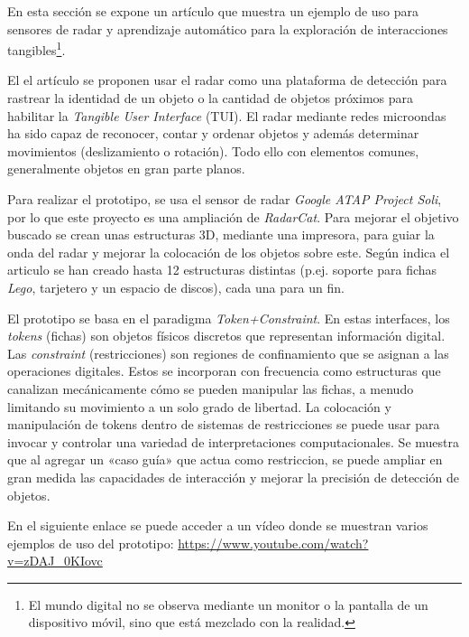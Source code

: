 En esta sección se expone un artículo que muestra un ejemplo de uso para sensores de radar y aprendizaje automático para la exploración de interacciones tangibles\footnote{El mundo digital no se observa mediante un monitor o la pantalla de un dispositivo móvil, sino que está mezclado con la realidad.}.\cite{Yeo2018Dec}  

El el artículo se proponen usar el radar como una plataforma de detección para rastrear la identidad de un objeto o la cantidad de objetos próximos para habilitar la \textit{Tangible User Interface} (TUI). El radar mediante redes microondas ha sido capaz de reconocer, contar y ordenar objetos y además determinar movimientos (deslizamiento o rotación). Todo ello con elementos comunes, generalmente objetos en gran parte planos.

Para realizar el prototipo, se usa el sensor de radar \textit{Google ATAP Project Soli}, por lo que este proyecto es una ampliación de \textit{RadarCat}. Para mejorar el objetivo buscado se crean unas estructuras 3D, mediante una impresora, para guiar la onda del radar y mejorar la colocación de los objetos sobre este. Según indica el articulo se han creado hasta 12 estructuras distintas (p.ej. soporte para fichas \textit{Lego}, tarjetero y un espacio de discos), cada una para un fin.

El prototipo se basa en el paradigma \textit{Token+Constraint}. En estas interfaces, los \textit{tokens} (fichas) son objetos físicos discretos que representan información digital. Las \textit{constraint} (restricciones) son regiones de confinamiento que se asignan a las operaciones digitales. Estos se incorporan con frecuencia como estructuras que canalizan mecánicamente cómo se pueden manipular las fichas, a menudo limitando su movimiento a un solo grado de libertad. La colocación y manipulación de tokens dentro de sistemas de restricciones se puede usar para invocar y controlar una variedad de interpretaciones computacionales. Se muestra que al agregar un «caso guía» que
actua como restriccion, se puede ampliar en gran medida las capacidades de interacción y mejorar la precisión de detección de objetos.

En el siguiente enlace se puede acceder a un vídeo donde se muestran varios ejemplos de uso del prototipo: \url{https://www.youtube.com/watch?v=zDAJ_0KIovc}

